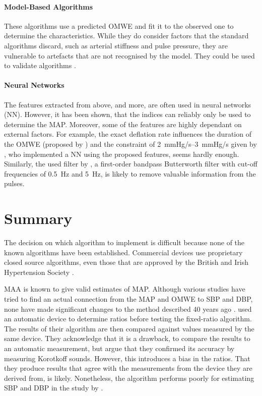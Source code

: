 \paragraph{Model-Based Algorithms} These algorithms use a predicted OMWE and fit it to the observed one to determine the characteristics. While they do consider factors that the standard algorithms discard, such as arterial stiffness and pulse pressure, they are vulnerable to artefacts that are not recognised by the model. They could be used to validate algorithms \citep{Babbs2012}.

\paragraph{Neural Networks} The features extracted from above, and more, are often used in neural networks (NN). However, it has been shown, that the indices can reliably only be used to determine the MAP. Moreover, some of the features are highly dependant on external factors. For example, the exact deflation rate influences the duration of the OMWE (proposed by \citet{Lee2013}) and the constraint of \SIrange{2}{3}{\mmHg/\second} given by \citet{Lim2015}, who implemented a NN using the proposed features, seems hardly enough. Similarly, the used filter by \citet{Lee2013}, a first-order bandpass Butterworth filter with cut-off frequencies of \SI{0.5}{\Hz} and \SI{5}{\Hz}, is likely to remove valuable information from the pulses.

\section{Summary}

The decision on which algorithm to implement is difficult because none of the known algorithms have been established. Commercial devices use proprietary closed source algorithms, even those that are approved by the British and Irish Hypertension Society \citep{BIHS2020}.

MAA is known to give valid estimates of MAP. Although various studies have tried to find an actual connection from the MAP and OMWE to SBP and DBP, none have made significant changes to the method described 40 years ago \citep{Geddes1982}. \citet{Jazbinsek2010} used an automatic device to determine ratios before testing the fixed-ratio algorithm. The results of their algorithm are then compared against values measured by the same device. They acknowledge that it is a drawback, to compare the results to an automatic measurement, but argue that they confirmed its accuracy by measuring Korotkoff sounds. However, this introduces a bias in the ratios. That they produce results that agree with the measurements from the device they are derived from, is likely. Nonetheless, the algorithm performs poorly for estimating SBP and DBP in the study by \citet{Jazbinsek2010}. 

